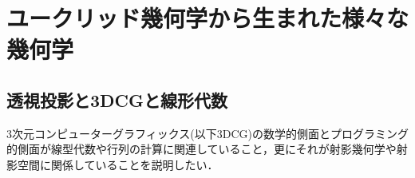 %
%
%
%
%
%
%
%
%
%

\chapter{ユークリッド幾何学から生まれた様々な幾何学}
\section{透視投影と3DCGと線形代数}
3次元コンピューターグラフィックス(以下3DCG)の数学的側面とプログラミング的側面が線型代数や行列の計算に関連していること，更にそれが射影幾何学や射影空間に関係していることを説明したい．

